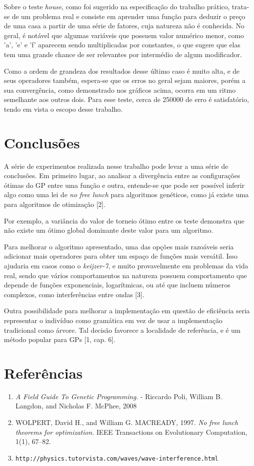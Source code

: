 \documentclass[11pt]{article}
\begin{document}
Sobre o teste \textit{house}, como foi sugerido na especificação do trabalho prático, trata-se de um problema real e consiste em aprender uma função para deduzir o preço de uma casa a partir de uma série de fatores, cuja natureza não é conhecida. No geral, é notável que algumas variáveis que possuem valor numérico menor, como 'a', 'e' e 'f' aparecem sendo multiplicadas por constantes, o que sugere que elas tem uma grande chance de ser relevantes por intermédio de algum modificador.

Como a ordem de grandeza dos resultados desse último caso é muito alta, e de seus operadores também, espera-se que os erros no geral sejam maiores, porém a sua convergência, como demonstrado nos gráficos acima, ocorra em um ritmo semelhante aos outros dois. Para esse teste, cerca de 250000 de erro é satisfatório, tendo em vista o escopo desse trabalho.

\section{Conclusões}

A série de experimentos realizada nesse trabalho pode levar a uma série de conclusões. Em primeiro lugar, ao analisar a divergência entre as configurações ótimas do GP entre uma função e outra, entende-se que pode ser possível inferir algo como uma lei de \textit{no free lunch} para algoritmos genéticos, como já existe uma para algoritmos de otimização [2].

Por exemplo, a variância do valor de torneio ótimo entre os teste demonstra que não existe um ótimo global dominante deste valor para um algoritmo.

Para melhorar o algoritmo apresentado, uma das opções mais razoáveis seria adicionar mais operadores para obter um espaço de funções mais versátil. Isso ajudaria em casos como o \textit{keijzer-7}, e muito provavelmente em problemas da vida real, sendo que vários comportamentos na natureza possuem comportamento que depende de funções exponenciais, logarítmicas, ou até que incluem números complexos, como interferências entre ondas [3].

Outra possibilidade para melhorar a implementação em questão de eficiência seria representar o indivíduo como gramática em vez de usar a implementação tradicional como árvore. Tal decisão favorece a localidade de referência, e é um método popular para GPs [1, cap. 6].

\section{Referências}

\begin{enumerate}
	\item \textit{A Field Guide To Genetic Programming.} - Riccardo Poli, William B. Langdon, and Nicholas F. McPhee, 2008
	\item WOLPERT, David H., and William G. MACREADY, 1997. \textit{No free lunch theorems for optimization.} IEEE Transactions on Evolutionary Computation, 1(1), 67–82.
	\item \texttt{http://physics.tutorvista.com/waves/wave-interference.html}
\end{enumerate}
\end{document}
